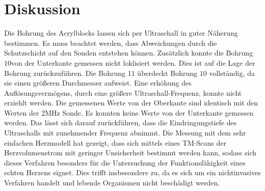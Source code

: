 \section{Diskussion}
\label{sec:Diskussion}
Die Bohrung des Acrylblocks lassen sich per Ultraschall in guter Näherung bestimmen.
Es muss beachtet werden, dass Abweichungen durch die Schutzschicht auf den Sonden entstehen können.
Zusätzlich konnte die Bohrung $10$von der Unterkante gemessen nicht loklisiert werden.
Dies ist auf die Lage der Bohrung zurückzuführen.
Die Bohrung $11$ überdeckt Bohrung $10$ vollständig, da sie einen größeren Durchmesser aufweist.
Eine erhöhung des Auflösungsvermögens, durch eine größere Ultraschall-Frequenz, konnte nicht erziehlt werden.
Die gemessenen Werte von der Oberkante sind identisch mit den Werten der $2\si{\mega\hertz}$ Sonde.
Es konnten keine Werte von der Unterkante gemessen werden.
Das lässt sich darauf zurückführen, dass die Eindringungstiefe des Ultraschalls mit zunehmender Frequenz abnimmt. 
\noindent Die Messung mit dem sehr einfachen Herzmodell hat gezeigt, dass sich mittels eines TM-Scans der Herzvolumenstrom mit geringer Unsicherheit
bestimmt werden kann, sodass sich dieses Verfahren besonders für die Untersuchung der Funktionsfähigkeit eines echten Herzens eignet.
Dies trifft insbesondere zu, da es sich um ein nichtinvasives Verfahren handelt und lebende Organismen nicht beschädigt werden.

